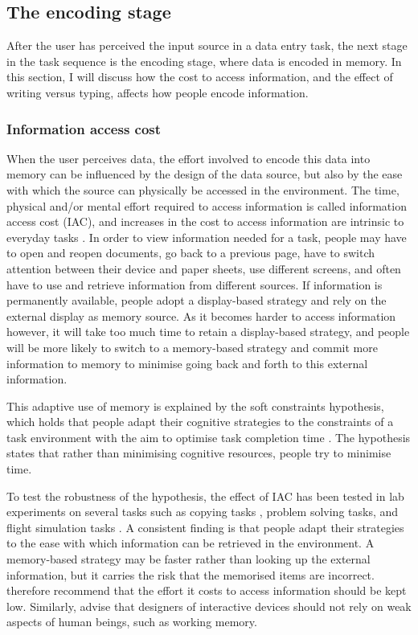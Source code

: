 \documentclass[11pt,oneside]{report}
\begin{document}
\subsection{The encoding stage}\label{sec:Encoding_stage}
After the user has perceived the input source in a data entry task, the next stage in the task sequence is the encoding stage, where data is encoded in memory. In this section, I will discuss how the cost to access information, and the effect of writing versus typing, affects how people encode information.

\subsubsection{Information access cost}
When the user perceives data, the effort involved to encode this data into memory can be influenced by the design of the data source, but also by the ease with which the source can physically be accessed in the environment. The time, physical and/or mental effort required to access information is called information access cost (IAC), and increases in the cost to access information are intrinsic to everyday tasks \citep{Morgan2009, Waldron2011}. In order to view information needed for a task, people may have to open and reopen documents, go back to a previous page, have to switch attention between their device and paper sheets, use different screens, and often have to use and retrieve information from different sources. If information is permanently available, people adopt a display-based strategy and rely on the external display as memory source. As it becomes harder to access information however, it will take too much time to retain a display-based strategy, and people will be more likely to switch to a memory-based strategy and commit more information to memory to minimise going back and forth to this external information.

This adaptive use of memory is explained by the soft constraints hypothesis, which holds that people adapt their cognitive strategies to the constraints of a task environment with the aim to optimise task completion time \citep{Gray2006}. The hypothesis states that rather than minimising cognitive resources, people try to minimise time. 

To test the robustness of the hypothesis, the effect of IAC has been tested in lab experiments on several tasks such as copying tasks \citep[e.g.][]{Gray2006}, problem solving tasks\citep[e.g.][]{Morgan2012}, and flight simulation tasks \citep{Waldron2007}. A consistent finding is that people adapt their strategies to the ease with which information can be retrieved in the environment.  A memory-based strategy may be faster rather than looking up the external information, but it carries the risk that the memorised items are incorrect. \citet{Gray2006} therefore recommend that the effort it costs to access information should be kept low. Similarly, \citet{Kohn2000} advise that designers of interactive devices should not rely on weak aspects of human beings, such as working memory.
\end{document}
